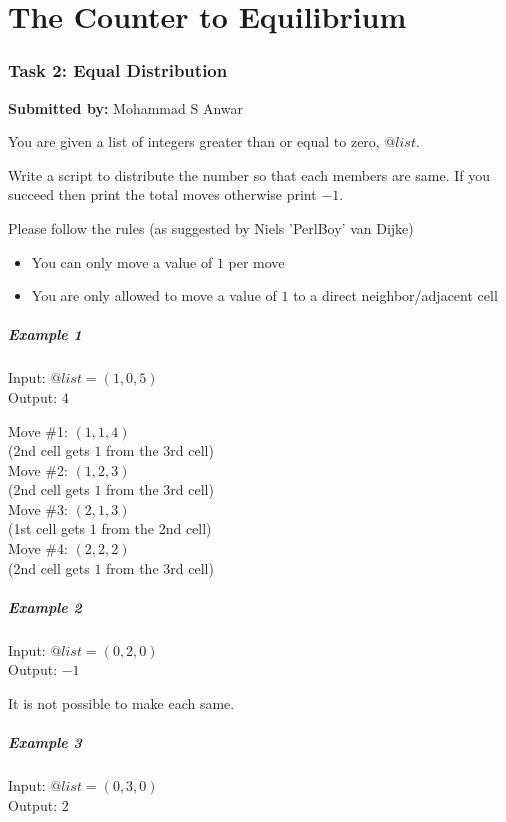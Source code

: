 \documentclass{article}
\begin{document}
\part*{The Counter to Equilibrium}
\section*{Task 2: Equal Distribution}
\textbf{Submitted by:} Mohammad S Anwar

You are given a list of integers greater than or equal to zero, $@list$.

Write a script to distribute the number so that each members are same.
If you succeed then print the total moves otherwise print $-1$.

Please follow the rules (as suggested by Niels 'PerlBoy' van Dijke) 
\begin{itemize}{}{}
\item You can only move a value of $1$ per move
\item You are only allowed to move a value of $1$ to a direct
  neighbor/adjacent cell 
\end{itemize}

\subsubsection*{Example 1}
Input: $@list = (1, 0, 5)$ \\
Output: $4$

Move \#1: $(1, 1, 4)$ \\
(2nd cell gets $1$ from the 3rd cell) \\
Move \#2: $(1, 2, 3)$ \\
(2nd cell gets $1$ from the 3rd cell) \\
Move \#3: $(2, 1, 3)$ \\
(1st cell gets $1$ from the 2nd cell) \\
Move \#4: $(2, 2, 2)$ \\
(2nd cell gets $1$ from the 3rd cell)

\subsubsection*{Example 2}
Input: $@list = (0, 2, 0)$\\
Output: $-1$

It is not possible to make each same.

\subsubsection*{Example 3}
Input: $@list = (0, 3, 0)$\\
Output: $2$
\end{document}
